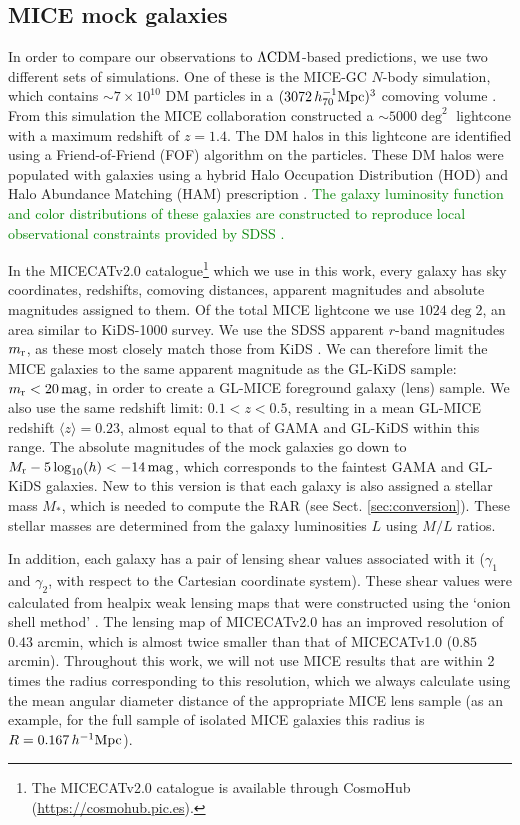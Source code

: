 \documentclass[usenatbib]{mnras}
\newcommand{\hMpc}{\, h^{-1}{\rm{Mpc}} }
\newcommand{\magn}{\, {\rm mag} }
\newcommand{\hsMpc}{\, h_{70}^{-1}{\rm{Mpc}} }
\newcommand{\lcdm}{{\rm \Lambda CDM}}
\newcommand*{\meanb}[1]{\langle{#1}\rangle}
\newcommand*{\E}[1]{\times 10^{#1}}
\newcommand{\un}[1]{_{\rm #1}}
\begin{document}
\subsection{MICE mock galaxies}
\label{sec:mice_mocks}

In order to compare our observations to $\lcdm$-based predictions, we use two different sets of simulations. One of these is the MICE-GC $N$-body simulation, which contains $\sim 7\E{10}$ DM particles in a $(3072 \hsMpc)^3$ comoving volume \cite[]{fosalba2015b}. From this simulation the MICE collaboration constructed a $\sim5000\deg^2$ lightcone with a maximum redshift of $z=1.4$. The DM halos in this lightcone are identified using a Friend-of-Friend (FOF) algorithm on the particles. These DM halos were populated with galaxies using a hybrid Halo Occupation Distribution (HOD) and Halo Abundance Matching (HAM) prescription \cite[]{carretero2015,crocce2015}. \textcolor{Green}{The galaxy luminosity function and color distributions of these galaxies are constructed to reproduce local observational constraints provided by SDSS \cite[]{blanton2003a, blanton2003b, blanton2005}.}

In the MICECATv2.0 catalogue\footnote{The MICECATv2.0 catalogue is available through CosmoHub (\url{https://cosmohub.pic.es}).} which we use in this work, every galaxy has sky coordinates, redshifts, comoving distances, apparent magnitudes and absolute magnitudes assigned to them. Of the total MICE lightcone we use $1024\deg2$, an area similar to KiDS-1000 survey. We use the SDSS apparent $r$-band magnitudes $m\un{r}$, as these most closely match those from KiDS \cite[see][]{brouwer2018}. We can therefore limit the MICE galaxies to the same apparent magnitude as the GL-KiDS sample: $m\un{r}<20 \, {\rm mag}$, in order to create a GL-MICE foreground galaxy (lens) sample. We also use the same redshift limit: $0.1<z<0.5$, resulting in a mean GL-MICE redshift $\meanb{z}=0.23$, almost equal to that of GAMA and GL-KiDS within this range. The absolute magnitudes of the mock galaxies go down to $M\un{r} - 5\log_{10}(h) < -14 \magn$, which corresponds to the faintest GAMA and GL-KiDS galaxies. New to this version is that each galaxy is also assigned a stellar mass $M_*$, which is needed to compute the RAR (see Sect. \ref{sec:conversion}). These stellar masses are determined from the galaxy luminosities $L$ using \cite{bell2001} $M/L$ ratios.

In addition, each galaxy has a pair of lensing shear values associated with it ($\gamma_1$ and $\gamma_2$, with respect to the Cartesian coordinate system). These shear values were calculated from healpix weak lensing maps that were constructed using the `onion shell method' \cite[]{fosalba2008, fosalba2015a}. The lensing map of MICECATv2.0 has an improved resolution of $0.43$ arcmin, which is almost twice smaller than that of MICECATv1.0 ($0.85$ arcmin). Throughout this work, we will not use MICE results that are within 2 times the radius corresponding to this resolution, which we always calculate using the mean angular diameter distance of the appropriate MICE lens sample (as an example, for the full sample of isolated MICE galaxies this radius is $R=0.167 \hMpc$).
\end{document}
